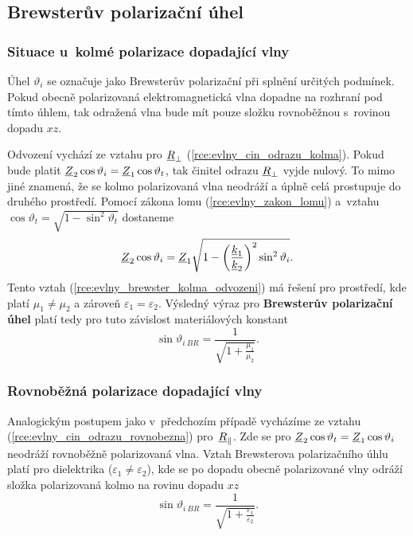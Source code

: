 \subsection{Brewsterův polarizační úhel}
\subsubsection*{Situace u~kolmé polarizace dopadající vlny}
Úhel $\vartheta_{i}$ se označuje jako Brewsterův polarizační při splnění určitých podmínek. Pokud obecně polarizovaná elektromagnetická vlna dopadne na rozhraní pod tímto úhlem, tak odražená vlna bude mít pouze složku rovnoběžnou s~rovinou dopadu $xz$.

Odvození vychází ze vztahu pro ${\underline{R}}_{\perp}$ (\ref{rce:evlny_cin_odrazu_kolma}). Pokud bude platit ${\underline{Z}}_{2}\cos\vartheta_{i} = {\underline{Z}}_{1}\cos\vartheta_{t}$, tak činitel odrazu ${\underline{R}}_{\perp}$ vyjde nulový. To mimo jiné znamená, že se kolmo polarizovaná vlna neodráží a úplně celá prostupuje do druhého prostředí. Pomocí zákona lomu (\ref{rce:evlny_zakon_lomu}) a~vztahu $\cos\vartheta_{t} = \sqrt{1-\sin^{2}\vartheta_{t}}$ dostaneme
\begin{equation}
	{\underline{Z}}_{2}\cos\vartheta_{i} = {\underline{Z}}_{1}\sqrt{1-\bigg(\frac{{\underline{k}}_{1}}{{\underline{k}}_{2}}\bigg)^{2}\sin^{2}\vartheta_{i}}.
	\label{rce:evlny_brewster_kolma_odvozeni}
\end{equation}
Tento vztah (\ref{rce:evlny_brewster_kolma_odvozeni}) má řešení pro prostředí, kde platí $\mu_{1} \ne \mu_{2}$ a zároveň $\varepsilon_{1} = \varepsilon_{2}$. Výsledný výraz pro {\bf Brewsterův polarizační úhel} platí tedy pro tuto závislost materiálových konstant
\begin{equation}
	\sin\vartheta_{i\ BR} = \frac{1}{\sqrt{1+\frac{\mu_{1}}{\mu_{2}}}}.
	\label{rce:evlny_brewster_kolma}
\end{equation}

\subsubsection*{Rovnoběžná polarizace dopadající vlny}
Analogickým postupem jako v~předchozím případě vycházíme ze vztahu (\ref{rce:evlny_cin_odrazu_rovnobezna}) pro~${\underline{R}}_{\parallel}$. Zde se pro ${\underline{Z}}_{2}\cos\vartheta_{t} = {\underline{Z}}_{1}\cos\vartheta_{i}$ neodráží rovnoběžně polarizovaná vlna. Vztah Brewsterova polarizačního úhlu platí pro dielektrika ($\varepsilon_{1} \ne \varepsilon_{2}$), kde se po dopadu obecně polarizované vlny odráží složka polarizovaná kolmo na rovinu dopadu $xz$
\begin{equation}
	\sin\vartheta_{i\ BR} = \frac{1}{\sqrt{1+\frac{\varepsilon_{1}}{\varepsilon_{2}}}}.
	\label{rce:evlny_brewster_kolma}
\end{equation}
\newpage


